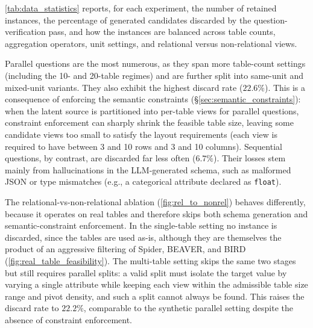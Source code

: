 \autoref{tab:data_statistics} reports, for each experiment, the number of
retained instances, the percentage of generated candidates discarded by
the question-verification pass, and how the instances are balanced across
table counts, aggregation operators, unit settings, and relational versus non-relational views.

Parallel questions are the most numerous, as they span more table-count
settings (including the 10- and 20-table regimes) and are further split
into same-unit and mixed-unit variants. They also exhibit the highest
discard rate ($22.6\%$). This is a consequence of enforcing the semantic
constraints (\S\ref{sec:semantic_constraints}): when the latent source is
partitioned into per-table views for parallel questions, constraint
enforcement can sharply shrink the feasible table size, leaving some
candidate views too small to satisfy the layout requirements (each view is required to have between 3 and 10 rows and 3 and 10 columns). Sequential
questions, by contrast, are discarded far less often ($6.7\%$). Their
losses stem mainly from hallucinations in the LLM-generated schema, such as
malformed JSON or type mismatches (e.g., a categorical attribute declared
as \texttt{float}).

The relational-vs-non-relational ablation (\autoref{fig:rel_to_nonrel})
behaves differently, because it operates on real tables and therefore
skips both schema generation and semantic-constraint enforcement. In the
single-table setting no instance is discarded, since the tables are used
as-is, although they are themselves the product of an aggressive
filtering of Spider, BEAVER, and BIRD
(\autoref{fig:real_table_feasibility}). The multi-table setting skips the
same two stages but still requires parallel splits: a valid split must
isolate the target value by varying a single attribute while keeping each
view within the admissible table size range and pivot density, and such a split cannot always be
found. This raises the discard rate to $22.2\%$, comparable to the
synthetic parallel setting despite the absence of constraint enforcement.


